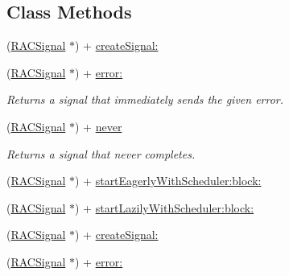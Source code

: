 \subsection*{Class Methods}
\begin{DoxyCompactItemize}
\item 
(\mbox{\hyperlink{interface_r_a_c_signal}{R\+A\+C\+Signal}} $\ast$) + \mbox{\hyperlink{interface_r_a_c_signal_a4ba374f148d6e2a0339c4f4202b4dc26}{create\+Signal\+:}}
\item 
\mbox{\label{interface_r_a_c_signal_aedd4ad7b4b8c1f7b26d41b5be6c83d83}} 
(\mbox{\hyperlink{interface_r_a_c_signal}{R\+A\+C\+Signal}} $\ast$) + \mbox{\hyperlink{interface_r_a_c_signal_aedd4ad7b4b8c1f7b26d41b5be6c83d83}{error\+:}}
\begin{DoxyCompactList}\small\item\em Returns a signal that immediately sends the given error. \end{DoxyCompactList}\item 
\mbox{\label{interface_r_a_c_signal_a27a1b1106a2543dcd472467a7c364dc7}} 
(\mbox{\hyperlink{interface_r_a_c_signal}{R\+A\+C\+Signal}} $\ast$) + \mbox{\hyperlink{interface_r_a_c_signal_a27a1b1106a2543dcd472467a7c364dc7}{never}}
\begin{DoxyCompactList}\small\item\em Returns a signal that never completes. \end{DoxyCompactList}\item 
(\mbox{\hyperlink{interface_r_a_c_signal}{R\+A\+C\+Signal}} $\ast$) + \mbox{\hyperlink{interface_r_a_c_signal_a6bee49e8a8ee2f41bcec31bb86948b37}{start\+Eagerly\+With\+Scheduler\+:block\+:}}
\item 
(\mbox{\hyperlink{interface_r_a_c_signal}{R\+A\+C\+Signal}} $\ast$) + \mbox{\hyperlink{interface_r_a_c_signal_adbef9afea68ea6a2a81bb3115f47c22c}{start\+Lazily\+With\+Scheduler\+:block\+:}}
\item 
(\mbox{\hyperlink{interface_r_a_c_signal}{R\+A\+C\+Signal}} $\ast$) + \mbox{\hyperlink{interface_r_a_c_signal_a4ba374f148d6e2a0339c4f4202b4dc26}{create\+Signal\+:}}
\item 
\mbox{\label{interface_r_a_c_signal_aedd4ad7b4b8c1f7b26d41b5be6c83d83}} 
(\mbox{\hyperlink{interface_r_a_c_signal}{R\+A\+C\+Signal}} $\ast$) + \mbox{\hyperlink{interface_r_a_c_signal_aedd4ad7b4b8c1f7b26d41b5be6c83d83}{error\+:}}

\end{DoxyCompactItemize}
